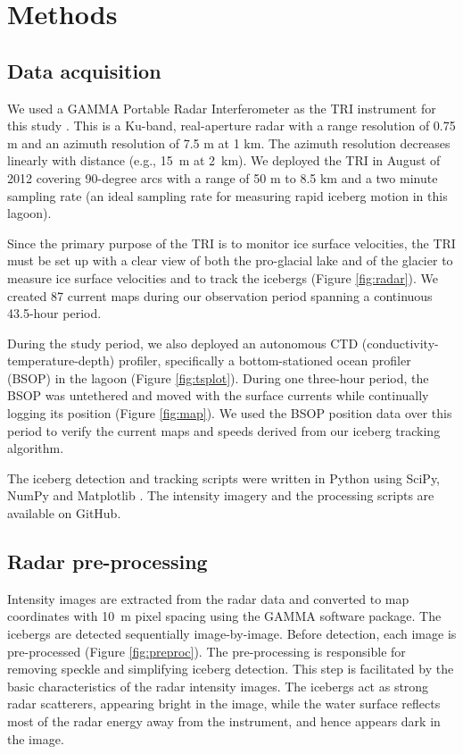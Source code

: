 \section{Methods}


\subsection{Data acquisition}
We used a GAMMA Portable Radar Interferometer as the TRI instrument for this study \citep{werner2008real}. This is a Ku-band, real-aperture radar with a range resolution of 0.75 m and an azimuth resolution of 7.5 m at 1 km. The azimuth resolution decreases linearly with distance (e.g., 15~m at 2~km). We deployed the TRI in August of 2012 covering 90-degree arcs with a range of 50 m to 8.5 km and a two minute sampling rate (an ideal sampling rate for measuring rapid iceberg motion in this lagoon). 

Since the primary purpose of the TRI is to monitor ice surface velocities, the TRI must be set up with a clear view of both the pro-glacial lake and of the glacier to measure ice surface velocities and to track the icebergs (Figure \ref{fig:radar}). We created 87 current maps during our observation period spanning a continuous 43.5-hour period.

During the study period, we also deployed an autonomous CTD (conductivity-temperature-depth) profiler, specifically a bottom-stationed ocean profiler (BSOP) \citep{langebrake2002design} in the lagoon (Figure \ref{fig:tsplot}). During one three-hour period, the BSOP was untethered and moved with the surface currents while continually logging its position (Figure \ref{fig:map}). We used the BSOP position data over this period to verify the current maps and speeds derived from our iceberg tracking algorithm.


The iceberg detection and tracking scripts were written in Python using SciPy, NumPy and Matplotlib \citep{hunter2007matplotlib, oliphant2007python}. The intensity imagery and the processing scripts are available on GitHub.


\subsection{Radar pre-processing}
Intensity images are extracted from the radar data and converted to map coordinates with 10~m pixel spacing using the GAMMA software package. The icebergs are detected sequentially image-by-image. Before detection, each image is pre-processed (Figure \ref{fig:preproc}). The pre-processing is responsible for removing speckle and simplifying iceberg detection. This step is facilitated by the basic characteristics of the radar intensity images. The icebergs act as strong radar scatterers, appearing bright in the image, while the water surface reflects most of the radar energy away from the instrument, and hence appears dark in the image.


